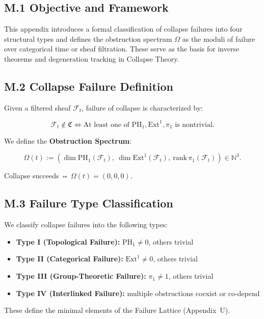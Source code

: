 \documentclass[11pt]{article}
\begin{document}
\subsection*{M.1 Objective and Framework}

This appendix introduces a formal classification of collapse failures into four structural types and defines the obstruction spectrum \( \Omega \) as the moduli of failure over categorical time or sheaf filtration. These serve as the basis for inverse theorems and degeneration tracking in Collapse Theory.

\subsection*{M.2 Collapse Failure Definition}

Given a filtered sheaf \( \mathcal{F}_t \), failure of collapse is characterized by:

\[
\mathcal{F}_t \notin \mathfrak{C}
\iff
\text{At least one of } \mathrm{PH}_1, \mathrm{Ext}^1, \pi_1 \text{ is nontrivial}.
\]

We define the \textbf{Obstruction Spectrum}:

\[
\Omega(t) := \left( \dim \mathrm{PH}_1(\mathcal{F}_t),\ \dim \mathrm{Ext}^1(\mathcal{F}_t),\ \mathrm{rank}\, \pi_1(\mathcal{F}_t) \right) \in \mathbb{N}^3.
\]

Collapse succeeds ⇔ \( \Omega(t) = (0,0,0) \).

\subsection*{M.3 Failure Type Classification}

We classify collapse failures into the following types:

\begin{itemize}
  \item \textbf{Type I (Topological Failure):} \( \mathrm{PH}_1 \neq 0 \), others trivial
  \item \textbf{Type II (Categorical Failure):} \( \mathrm{Ext}^1 \neq 0 \), others trivial
  \item \textbf{Type III (Group-Theoretic Failure):} \( \pi_1 \neq 1 \), others trivial
  \item \textbf{Type IV (Interlinked Failure):} multiple obstructions coexist or co-depend
\end{itemize}

These define the minimal elements of the Failure Lattice (Appendix~U).
\end{document}

